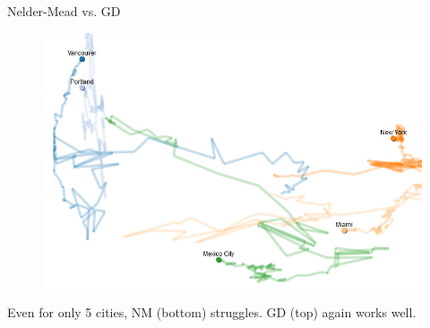 \documentclass[11pt,compress,t,notes=noshow, xcolor=table]{beamer}
\begin{document}
\begin{vbframe}{Nelder-Mead vs. GD}
\begin{figure}
\begin{minipage}{0.45\textwidth}
    \end{minipage}\hfill
    \begin{minipage}{0.45\textwidth}
        \centering
        \includegraphics[width = 0.8\linewidth]{figure_man/nm_gd_cities_8.PNG}
    \end{minipage}
\end{figure}
\vspace*{0.5cm}
\begin{footnotesize}
Even for only 5 cities, NM (bottom) struggles. GD (top) again works well.
\end{footnotesize}

\end{vbframe}




\end{document}
